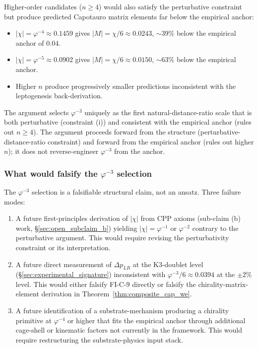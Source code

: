 \documentclass[11pt,letterpaper]{article}
\newcommand{\phig}{\varphi}
\newcommand{\DeltapLR}{\Delta p_{LR}}
\begin{document}
Higher-order candidates ($n \geq 4$) would also satisfy the perturbative constraint but produce predicted Capotauro matrix elements far below the empirical anchor:

\begin{itemize}\setlength\itemsep{0.2em}
    \item $|\chi| = \phig^{-4} \approx 0.1459$ gives $|M| = \chi/6 \approx 0.0243$, $\sim 39\%$ below the empirical anchor of $0.04$.
    \item $|\chi| = \phig^{-5} \approx 0.0902$ gives $|M| = \chi/6 \approx 0.0150$, $\sim 63\%$ below the empirical anchor.
    \item Higher $n$ produce progressively smaller predictions inconsistent with the leptogenesis back-derivation.
\end{itemize}

The argument selects $\phig^{-3}$ uniquely as the first natural-distance-ratio scale that is both perturbative (constraint (i)) and consistent with the empirical anchor (rules out $n \geq 4$). The argument proceeds forward from the structure (perturbative-distance-ratio constraint) and forward from the empirical anchor (rules out higher $n$); it does not reverse-engineer $\phig^{-3}$ from the anchor.

\subsubsection{What would falsify the $\phig^{-3}$ selection}\label{sec:chi_falsifier}

The $\phig^{-3}$ selection is a falsifiable structural claim, not an ansatz. Three failure modes:

\begin{enumerate}\setlength\itemsep{0.2em}
    \item A future first-principles derivation of $|\chi|$ from CPP axioms (sub-claim (b) work, \S\ref{sec:open_subclaim_b}) yielding $|\chi| = \phig^{-1}$ or $\phig^{-2}$ contrary to the perturbative argument. This would require revising the perturbativity constraint or its interpretation.
    \item A future direct measurement of $\DeltapLR$ at the K3-doublet level (\S\ref{sec:experimental_signature}) inconsistent with $\phig^{-3}/6 \approx 0.0394$ at the $\pm 2\%$ level. This would either falsify FI-C-9 directly or falsify the chirality-matrix-element derivation in Theorem~\ref{thm:composite_cap_we}.
    \item A future identification of a substrate-mechanism producing a chirality primitive at $\phig^{-4}$ or higher that fits the empirical anchor through additional cage-shell or kinematic factors not currently in the framework. This would require restructuring the substrate-physics input stack.
\end{enumerate}
\end{document}
